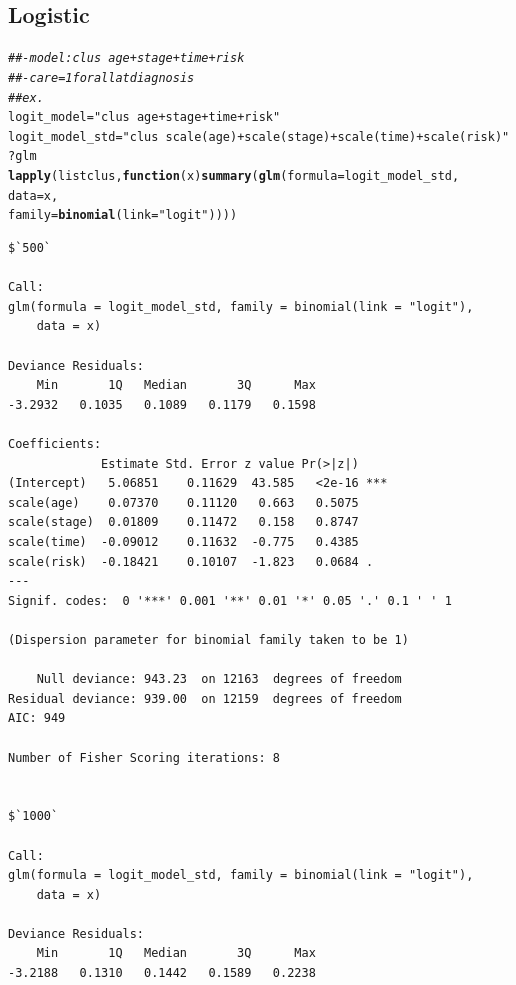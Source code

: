 \documentclass[]{revtex4}\usepackage[]{graphicx}\usepackage[]{color}
\makeatletter
\newcommand{\hlstr}[1]{\textcolor[rgb]{0.192,0.494,0.8}{#1}}%
\newcommand{\hlcom}[1]{\textcolor[rgb]{0.678,0.584,0.686}{\textit{#1}}}%
\newcommand{\hlopt}[1]{\textcolor[rgb]{0,0,0}{#1}}%
\newcommand{\hlstd}[1]{\textcolor[rgb]{0.345,0.345,0.345}{#1}}%
\newcommand{\hlkwa}[1]{\textcolor[rgb]{0.161,0.373,0.58}{\textbf{#1}}}%
\newcommand{\hlkwb}[1]{\textcolor[rgb]{0.69,0.353,0.396}{#1}}%
\newcommand{\hlkwc}[1]{\textcolor[rgb]{0.333,0.667,0.333}{#1}}%
\newcommand{\hlkwd}[1]{\textcolor[rgb]{0.737,0.353,0.396}{\textbf{#1}}}%
\newenvironment{kframe}{%
 \def\at@end@of@kframe{}%
 \ifinner\ifhmode%
  \def\at@end@of@kframe{\end{minipage}}%
  \begin{minipage}{\columnwidth}%
 \fi\fi%
 \def\FrameCommand##1{\hskip\@totalleftmargin \hskip-\fboxsep
 \colorbox{shadecolor}{##1}\hskip-\fboxsep
     \hskip-\linewidth \hskip-\@totalleftmargin \hskip\columnwidth}%
 \MakeFramed {\advance\hsize-\width
   \@totalleftmargin\z@ \linewidth\hsize
   \@setminipage}}%
 {\par\unskip\endMakeFramed%
 \at@end@of@kframe}
\newenvironment{knitrout}{}{} %
\makeatother
\begin{document}
\subsection{Logistic}
\begin{knitrout}
\color{fgcolor}\begin{kframe}
\begin{alltt}
\hlcom{##- model: clus ~ age +  stage + time + risk}
\hlcom{##- care = 1 for all at diagnosis}
\hlcom{## ex. }
\hlstd{logit_model} \hlkwb{=} \hlstr{"clus ~ age + stage + time + risk"}
\hlstd{logit_model_std} \hlkwb{=} \hlstr{"clus ~ scale(age) + scale(stage) + scale(time) + scale(risk)"}
\hlopt{?}\hlstd{glm}
\hlkwd{lapply}\hlstd{(listclus,} \hlkwa{function}\hlstd{(}\hlkwc{x}\hlstd{)} \hlkwd{summary}\hlstd{(}\hlkwd{glm}\hlstd{(}\hlkwc{formula} \hlstd{= logit_model_std,}
                                 \hlkwc{data} \hlstd{= x,}
                                 \hlkwc{family} \hlstd{=} \hlkwd{binomial}\hlstd{(}\hlkwc{link} \hlstd{=} \hlstr{"logit"}\hlstd{))))}
\end{alltt}
\begin{verbatim}
$`500`

Call:
glm(formula = logit_model_std, family = binomial(link = "logit"), 
    data = x)

Deviance Residuals: 
    Min       1Q   Median       3Q      Max  
-3.2932   0.1035   0.1089   0.1179   0.1598  

Coefficients:
             Estimate Std. Error z value Pr(>|z|)    
(Intercept)   5.06851    0.11629  43.585   <2e-16 ***
scale(age)    0.07370    0.11120   0.663   0.5075    
scale(stage)  0.01809    0.11472   0.158   0.8747    
scale(time)  -0.09012    0.11632  -0.775   0.4385    
scale(risk)  -0.18421    0.10107  -1.823   0.0684 .  
---
Signif. codes:  0 '***' 0.001 '**' 0.01 '*' 0.05 '.' 0.1 ' ' 1

(Dispersion parameter for binomial family taken to be 1)

    Null deviance: 943.23  on 12163  degrees of freedom
Residual deviance: 939.00  on 12159  degrees of freedom
AIC: 949

Number of Fisher Scoring iterations: 8


$`1000`

Call:
glm(formula = logit_model_std, family = binomial(link = "logit"), 
    data = x)

Deviance Residuals: 
    Min       1Q   Median       3Q      Max  
-3.2188   0.1310   0.1442   0.1589   0.2238  


\end{verbatim}
\end{kframe}
\end{knitrout}
\end{document}
